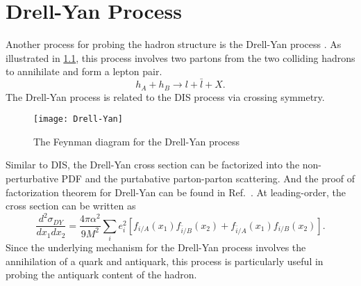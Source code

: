 \documentclass[../main.tex]{subfiles}
\begin{document}
\chapter{Drell-Yan Process}
\label{ch:DY}
Another process for probing the hadron structure is the Drell-Yan process \cite{drell1970}.
As illustrated in \cref{fig:DY}, this process involves two partons from the
two colliding hadrons to annihilate and form a lepton pair.
\begin{equation}
	h_A + h_B \rightarrow l + \bar{l} + X.
\end{equation}
The Drell-Yan process is related to the DIS process via crossing symmetry.
\begin{figure}[htbp!]
	\centering
	\texttt{[image: Drell-Yan]}
	\caption{The Feynman diagram for the Drell-Yan process}
	\label{fig:DY}
\end{figure}
Similar to DIS, the Drell-Yan cross section can be factorized into the non-perturbative
PDF and the purtabative parton-parton scattering. And the proof of factorization
theorem for Drell-Yan can be found in Ref.~\cite{collins1989}. At leading-order,
the cross section can be written as
\begin{equation}
	\frac{d^2\sigma_{DY}}{dx_{1}dx_{2}} = \frac{4\pi\alpha^2}{9M^2}\sum_i e^2_i
	\left[f_{i/A}\left(x_1\right)f_{\bar{i}/B}\left(x_2\right) +
	f_{\bar{i}/A}\left(x_1\right)f_{i/B}\left(x_2\right)
	\right].
	\label{eq:DY_cs}
\end{equation}
Since the underlying mechanism for the Drell-Yan process involves the annihilation
of a quark and antiquark, this process is particularly useful in probing the antiquark
content of the hadron.
\end{document}

